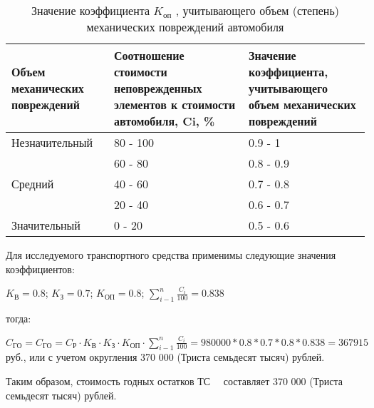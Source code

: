 \noindent \begin{table}[H]
	\label{tab:KO}
	\caption{\footnotesize {Значение коэффициента $ K_{\text{оп}} $ , учитывающего объем (степень) механических повреждений автомобиля}} 
	\centering
\begin{tabular}{|p{47mm}| p{53mm}| p{50mm}|}
	\hline
	Объем механических повреждений & Соотношение стоимости неповрежденных элементов к стоимости автомобиля, Ci, \% & Значение коэффициента, учитывающего объем механических повреждений \\ \hline
	Незначительный                 & 80 - 100                                                                      & 0.9 - 1                                                            \\
	& 60 - 80                                                                       & 0.8 - 0.9                                                          \\
	Средний                        & 40 - 60                                                                       & 0.7 - 0.8                                                          \\
	& 20 - 40                                                                       & 0.6 - 0.7                                                          \\
	Значительный                   & 0 - 20                                                                        & 0.5 - 0.6                                                          \\ \hline
\end{tabular}
\end{table}

 \par
 
 
 Для исследуемого транспортного средства применимы следующие значения коэффициентов:\par
 $ K_{\text{В}} =0.8  $; 
 $ K_{\text{З}} =0.7 $; 
 $ K_{\text{ОП}} =0.8 $; $ \sum\limits_{i-1}^{n}\frac{C_i}{100} = 0.838 $ \par тогда:
 \par
$  C_{\text{ГО}} =  C_{\text{ГО}}= C_{\text{Р}} \cdot K_{\text{В}}\cdot K_{\text{З}}\cdot K_{\text{ОП}} \cdot  \sum\limits_{i-1}^{n}\frac{C_i}{100} =980000*0.8*0.7*0.8*0.838 = 367915 $ руб., или с учетом округления 370 000 (Триста семьдесят тысяч) рублей.
\par Таким образом, стоимость годных остатков ТС  \, \, составляет 370 000 (Триста семьдесят тысяч) рублей.

